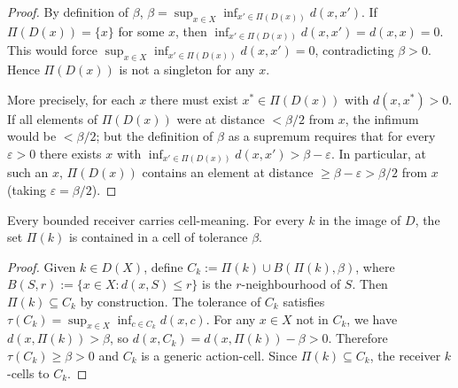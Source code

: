 \documentclass[twocolumn,11pt,a4paper]{article}
\newcommand{\eps}{\varepsilon}
\begin{document}
\begin{proof}
By definition of $\beta$,
$\beta=\sup_{x\in X}\inf_{x'\in\Pi(D(x))}d(x,x')$.
If $\Pi(D(x))=\{x\}$ for some $x$, then
$\inf_{x'\in\Pi(D(x))}d(x,x')=d(x,x)=0$.
This would force $\sup_{x\in X}\inf_{x'\in\Pi(D(x))}d(x,x')=0$,
contradicting $\beta>0$.  Hence $\Pi(D(x))$ is not a singleton for any
$x$.

More precisely, for each $x$ there must exist $x^*\in\Pi(D(x))$ with
$d(x,x^*)>0$.  If all elements of $\Pi(D(x))$ were at distance $<\beta/2$
from $x$, the infimum would be $<\beta/2$; but the definition of $\beta$
as a supremum requires that for every $\eps>0$ there exists $x$ with
$\inf_{x'\in\Pi(D(x))}d(x,x')>\beta-\eps$.  In particular, at such an
$x$, $\Pi(D(x))$ contains an element at distance $\geq\beta-\eps>\beta/2$
from $x$ (taking $\eps=\beta/2$).
\end{proof}

\begin{theorem}
\label{thm:cellgeneric}
Every bounded receiver carries cell-meaning.  For every $k$ in the image
of $D$, the set $\Pi(k)$ is contained in a cell of tolerance $\beta$.
\end{theorem}

\begin{proof}
Given $k\in D(X)$, define $C_k:=\Pi(k)\cup B(\Pi(k),\beta)$, where
$B(S,r):=\{x\in X:d(x,S)\leq r\}$ is the $r$-neighbourhood of $S$.
Then $\Pi(k)\subseteq C_k$ by construction.  The tolerance of $C_k$
satisfies $\tau(C_k)=\sup_{x\in X}\inf_{c\in C_k}d(x,c)$.  For any
$x\in X$ not in $C_k$, we have $d(x,\Pi(k))>\beta$, so
$d(x,C_k)=d(x,\Pi(k))-\beta>0$.  Therefore $\tau(C_k)\geq\beta>0$ and
$C_k$ is a generic action-cell.  Since $\Pi(k)\subseteq C_k$, the
receiver $k$-cells to $C_k$.
\end{proof}
\end{document}

